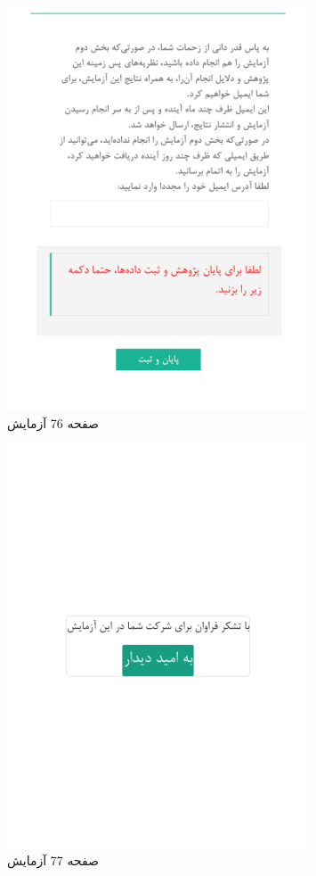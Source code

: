 \begin{figure}[htpb]
    \centering
    \includegraphics[width=0.8\textwidth]{./img/Task76.png}
    \caption{ صفحه 76 آزمایش }
    \label{fig:Task76}
\end{figure}


\begin{figure}[htpb]
    \centering
    \includegraphics[width=0.8\textwidth]{./img/Task77.png}
    \caption{ صفحه 77 آزمایش }
    \label{fig:Task77}
\end{figure}


